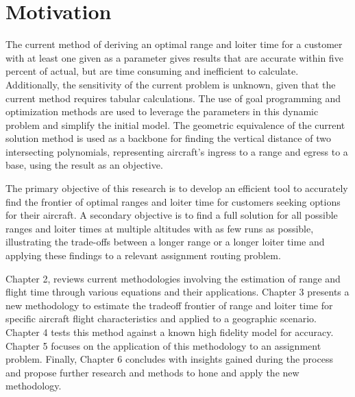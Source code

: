 \section{Motivation}
\hspace{.5cm}The current method of deriving an optimal range and loiter time for a customer with at least one given as a parameter gives results that are accurate within five percent of actual, but are time consuming and inefficient to calculate. Additionally, the sensitivity of the current problem is unknown, given that the current method requires tabular calculations. The use of goal programming and optimization methods are used to leverage the parameters in this dynamic problem and simplify the initial model. The geometric equivalence of the current solution method is used as a backbone for finding the vertical distance of two intersecting polynomials, representing aircraft's ingress to a range and egress to a base, using the result as an objective.\par
The primary objective of this research is to develop an efficient tool to accurately find the frontier of optimal ranges and loiter time for customers seeking options for their aircraft. A secondary objective is to find a full solution for all possible ranges and loiter times at multiple altitudes with as few runs as possible, illustrating the trade-offs between a longer range or a longer loiter time and applying these findings to a relevant assignment routing problem. \par
Chapter 2, reviews current methodologies involving the estimation of range and flight time through various equations and their applications. Chapter 3 presents a new methodology to estimate the tradeoff frontier of range and loiter time for specific aircraft flight characteristics and applied to a geographic scenario. Chapter 4 tests this method against a known high fidelity model for accuracy. Chapter 5 focuses on the application of this methodology to an assignment problem. Finally, Chapter 6 concludes with insights gained during the process and propose further research and methods to hone and apply the new methodology.

